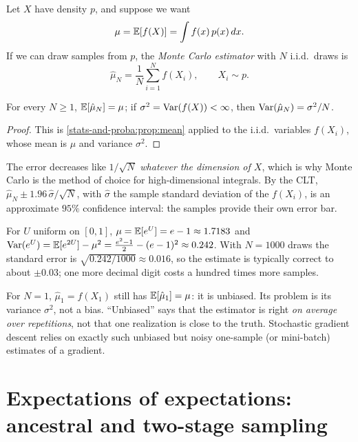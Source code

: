 \begin{notechapter}
Let $X$ have density $p$, and suppose we want
\[
  \mu = \mathbb{E}[f(X)] = \int f(x)\,p(x)\,dx .
\]
If we can draw samples from $p$, the \emph{Monte Carlo estimator} with $N$
i.i.d.\ draws is
\[
  \hat\mu_N = \frac1N\sum_{i=1}^Nf(X_i),\qquad X_i\sim p .
\]

\begin{proposition}\label{monte-carlo:prop:plain}
For every $N\geq1$, $\mathbb{E}[\hat\mu_N] = \mu$; if $\sigma^2 = \operatorname{Var}(f(X))<\infty$, then
$\operatorname{Var}(\hat\mu_N) = \sigma^2/N$.
\end{proposition}

\begin{proof}
This is \cref{stats-and-proba:prop:mean} applied to the i.i.d.\ variables
$f(X_i)$, whose mean is $\mu$ and variance $\sigma^2$.
\end{proof}

The error decreases like $1/\sqrt N$ \emph{whatever the dimension of $X$}, which
is why Monte Carlo is the method of choice for high-dimensional integrals. By the
CLT, $\hat\mu_N\pm1.96\,\hat\sigma/\sqrt N$, with $\hat\sigma$ the sample standard
deviation of the $f(X_i)$, is an approximate $95\%$ confidence interval: the
samples provide their own error bar.

\begin{example}\label{monte-carlo:ex:exp}
For $U$ uniform on $[0,1]$, $\mu = \mathbb{E}[e^U] = e - 1\approx1.7183$ and
$\operatorname{Var}(e^U) = \mathbb{E}[e^{2U}] - \mu^2 = \frac{e^2-1}2 - (e-1)^2\approx0.242$. With
$N = 1000$ draws the standard error is $\sqrt{0.242/1000}\approx0.016$, so the
estimate is typically correct to about $\pm0.03$; one more decimal digit costs a
hundred times more samples.
\end{example}

\begin{pitfall}
For $N = 1$, $\hat\mu_1 = f(X_1)$ still has $\mathbb{E}[\hat\mu_1] = \mu$: it is unbiased.
Its problem is its variance $\sigma^2$, not a bias. ``Unbiased'' says that the
estimator is right \emph{on average over repetitions}, not that one realization
is close to the truth. Stochastic gradient descent relies on exactly such
unbiased but noisy one-sample (or mini-batch) estimates of a gradient.
\end{pitfall}

\section{Expectations of expectations: ancestral and two-stage sampling}\label{monte-carlo:sec:hierarchical}


\end{notechapter}
